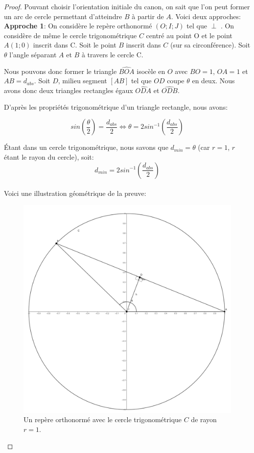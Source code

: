 \documentclass{amsart}
\theoremstyle{definition}
\theoremstyle{remark}
\numberwithin{equation}{section}
\renewcommand*{\overrightarrow}[1]{\vbox{\halign{##\cr 
  \tiny\rightarrowfill\cr\noalign{\nointerlineskip\vskip1pt} 
  $#1\mskip2mu$\cr}}}
\begin{document}
\begin{proof}
  Pouvant choisir l'orientation initiale du canon, on sait que l'on peut former un arc de cercle permettant d'atteindre $B$ à partir de $A$.
  Voici deux approches:\\

  \textbf{Approche 1}: On considère le repère orthonormé $(O;I;J)$ tel que \overrightarrow{OI} $\perp$ \overrightarrow{OJ}. On considère de même le cercle trigonométrique $C$ centré au point O et le point $A(1;0)$ inscrit dans C. Soit le point
  $B$ inscrit dans $C$ (sur sa circonférence).
  Soit $\theta$ l'angle séparant $A$ et $B$ à travers le cercle C.
  
  Nous pouvons donc former le triangle $\widehat{BOA}$ isocèle en $O$ avec $BO=1$, $OA=1$ et $AB=d_{abs}$. Soit $D$, milieu segment $[AB]$ tel que $OD$ coupe $\theta$ en deux. Nous avons donc deux triangles rectangles égaux $\widehat{ODA}$ et $\widehat{ODB}$.

  D'après les propriétés trigonométrique d'un triangle rectangle, nous avons:

  \[sin(\frac{\theta}{2})=\frac{d_{abs}}{2} \Leftrightarrow \theta = 2sin^{-1}(\frac{d_{abs}}{2})\]

  Étant dans un cercle trigonométrique, nous savons que $d_{min}=\theta$ (car $r=1$, $r$ étant le rayon du cercle), soit: 
  \[d_{min}=2sin^{-1}(\frac{d_{abs}}{2})\] \\

  Voici une illustration géométrique de la preuve:

  \begin{figure}[H]
    \centering
    \includegraphics[scale=0.2]{angle.png}
    \caption{Un repère orthonormé avec le cercle trigonométrique $C$ de rayon $r=1$.}
  \end{figure}


\end{proof}
\end{document}
